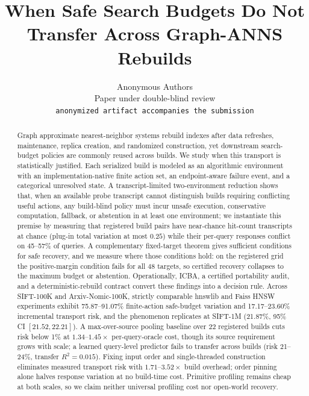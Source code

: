 \documentclass{article}
\title{When Safe Search Budgets Do Not Transfer Across Graph-ANNS Rebuilds}
\author{Anonymous Authors\\
Paper under double-blind review\\
\texttt{anonymized artifact accompanies the submission}}
\begin{document}
\maketitle

\begin{abstract}
Graph approximate nearest-neighbor systems rebuild indexes after data refreshes, maintenance, replica
creation, and randomized construction, yet downstream search-budget policies are commonly reused across
builds. We study when this transport is statistically justified. Each serialized build is modeled as an
algorithmic environment with an implementation-native finite action set, an endpoint-aware failure event,
and a categorical unresolved state. A transcript-limited two-environment reduction shows that, when an
available probe transcript cannot distinguish builds requiring conflicting useful actions, any build-blind
policy must incur unsafe execution, conservative computation, fallback, or abstention in at least one
environment; we instantiate this premise by measuring that registered build pairs have near-chance
hit-count transcripts at chance (plug-in total variation at most $0.25$) while their per-query responses conflict on
45--57\% of queries. A complementary fixed-target theorem gives sufficient conditions for safe recovery, and
we measure where those conditions hold: on the registered grid the positive-margin condition fails for all
48 targets, so certified recovery collapses to the maximum budget or abstention. Operationally, ICBA, a
certified portability audit, and a deterministic-rebuild contract convert these findings into a decision
rule. Across SIFT-100K and Arxiv-Nomic-100K, strictly comparable hnswlib and Faiss HNSW experiments exhibit
75.87--91.07\% finite-action safe-budget variation and 17.17--23.60\% incremental transport risk, and the
phenomenon replicates at SIFT-1M (21.87\%, 95\% CI $[21.52, 22.21]$). A max-over-source pooling baseline over
22 registered builds cuts risk below 1\% at $1.34$--$1.45\times$ per-query-oracle cost, though its source
requirement grows with scale; a learned query-level predictor fails to transfer across builds (risk 21--24\%,
transfer $R^2 = 0.015$). Fixing input order and single-threaded construction eliminates measured transport
risk with $1.71$--$3.52\times$ build overhead; order pinning alone halves response variation at no build-time
cost. Primitive profiling remains cheap at both scales, so we claim neither universal profiling cost nor
open-world recovery.
\end{abstract}
\end{document}
